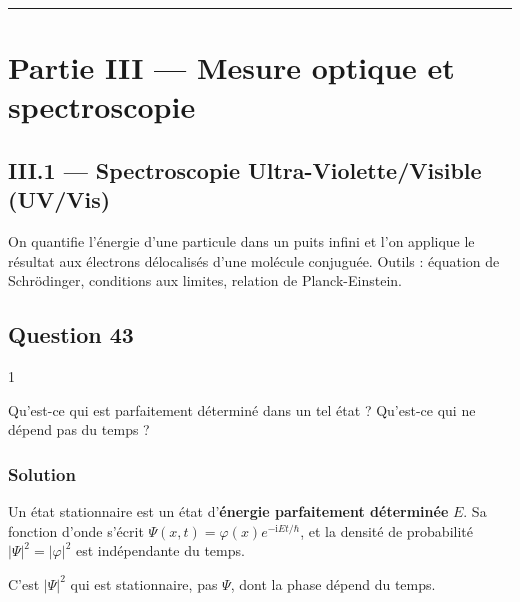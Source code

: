 \documentclass[11pt,a4paper]{article}
\begin{document}
\begin{center}\rule{0.5\linewidth}{0.5pt}\end{center}

\hypertarget{partie-iii-mesure-optique-et-spectroscopie}{%
\section{Partie III --- Mesure optique et spectroscopie}\label{partie-iii-mesure-optique-et-spectroscopie}}

\hypertarget{iii.1-spectroscopie-ultra-violettevisible-uvvis}{%
\subsection{III.1 --- Spectroscopie Ultra-Violette/Visible (UV/Vis)}\label{iii.1-spectroscopie-ultra-violettevisible-uvvis}}

On quantifie l'énergie d'une particule dans un puits infini et l'on applique le résultat aux électrons délocalisés d'une molécule conjuguée. Outils : équation de Schrödinger, conditions aux limites, relation de Planck-Einstein.

\hypertarget{question-43}{%
\subsection{Question 43}\label{question-43}}

\begin{indication}{1}

Qu'est-ce qui est parfaitement déterminé dans un tel état ? Qu'est-ce qui ne dépend pas du temps ?

\end{indication}

\hypertarget{solution-42}{%
\subsubsection{Solution}\label{solution-42}}

Un état stationnaire est un état d'\textbf{énergie parfaitement déterminée} \(E\). Sa fonction d'onde s'écrit \(\Psi(x,t)=\varphi(x)e^{-\mathrm{i}Et/\hbar}\), et la densité de probabilité \(|\Psi|^2=|\varphi|^2\) est indépendante du temps.

\begin{piege}

C'est \(|\Psi|^2\) qui est stationnaire, pas \(\Psi\), dont la phase dépend du temps.

\end{piege}
\end{document}
